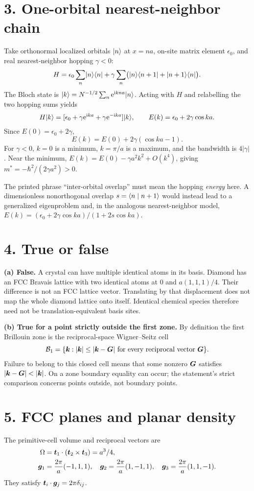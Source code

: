 \section*{3. One-orbital nearest-neighbor chain}
Take orthonormal localized orbitals $\lvert n\rangle$ at $x=na$, on-site matrix element $\epsilon_0$, and real nearest-neighbor hopping $\gamma<0$:
\[
H=\epsilon_0\sum_n\lvert n\rangle\langle n\rvert+
\gamma\sum_n\bigl(\lvert n\rangle\langle n+1\rvert+\lvert n+1\rangle\langle n\rvert\bigr).
\]
The Bloch state is $\lvert k\rangle=N^{-1/2}\sum_n\mathrm{e}^{\mathrm{i} kna}\lvert n\rangle$. Acting with $H$ and relabelling the two hopping sums yields
\[
H\lvert k\rangle=[\epsilon_0+\gamma\mathrm{e}^{\mathrm{i} ka}+\gamma\mathrm{e}^{-\mathrm{i} ka}]\lvert k\rangle,
\qquad E(k)=\epsilon_0+2\gamma\cos ka.
\]
Since $E(0)=\epsilon_0+2\gamma$,
\[
\boxed{E(k)=E(0)+2\gamma(\cos ka-1).}
\]
For $\gamma<0$, $k=0$ is a minimum, $k=\pi/a$ is a maximum, and the bandwidth is $4|\gamma|$. Near the minimum, $E(k)=E(0)-\gamma a^2k^2+O(k^4)$, giving $m^*=-\hbar^2/(2\gamma a^2)>0$.

The printed phrase ``inter-orbital overlap'' must mean the hopping \emph{energy} here. A dimensionless nonorthogonal overlap $s=\langle n\mid n+1\rangle$ would instead lead to a generalized eigenproblem and, in the analogous nearest-neighbor model, $E(k)=(\epsilon_0+2\gamma\cos ka)/(1+2s\cos ka)$.

\section*{4. True or false}
\textbf{(a) False.} A crystal can have multiple identical atoms in its basis. Diamond has an FCC Bravais lattice with two identical atoms at $0$ and $a(1,1,1)/4$. Their difference is not an FCC lattice vector. Translating by that displacement does not map the whole diamond lattice onto itself. Identical chemical species therefore need not be translation-equivalent basis sites.

\textbf{(b) True for a point strictly outside the first zone.} By definition the first Brillouin zone is the reciprocal-space Wigner--Seitz cell
\[
\mathcal B_1=\{\boldsymbol{k}:|\boldsymbol{k}|\le|\boldsymbol{k}-\boldsymbol{G}|
\text{ for every reciprocal vector }\boldsymbol{G}\}.
\]
Failure to belong to this closed cell means that some nonzero $\boldsymbol{G}$ satisfies $|\vct k-\vct G|<|\vct k|$. On a zone boundary equality can occur; the statement's strict comparison concerns points outside, not boundary points.

\section*{5. FCC planes and planar density}
The primitive-cell volume and reciprocal vectors are
\begin{align*}
\Omega&=\boldsymbol{t}_1\cdot(\boldsymbol{t}_2\times\boldsymbol{t}_3)=a^3/4,\\
\boldsymbol{g}_1&=\frac{2\pi}{a}(-1,1,1),\quad
\boldsymbol{g}_2=\frac{2\pi}{a}(1,-1,1),\quad
\boldsymbol{g}_3=\frac{2\pi}{a}(1,1,-1).
\end{align*}
They satisfy $\boldsymbol{t}_i\cdot\boldsymbol{g}_j=2\pi\delta_{ij}$.

